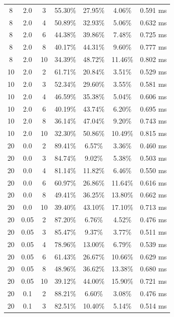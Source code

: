 \documentclass[11pt,a4paper]{article}
\begin{document}
\begin{longtable}{ccccccc}
        8 & 2.0 & 3 & 55.30\% & 27.95\% & 4.06\% & 0.591 ms \\
        8 & 2.0 & 4 & 50.89\% & 32.93\% & 5.06\% & 0.632 ms \\
        8 & 2.0 & 6 & 44.38\% & 39.86\% & 7.48\% & 0.725 ms \\
        8 & 2.0 & 8 & 40.17\% & 44.31\% & 9.60\% & 0.777 ms \\
        8 & 2.0 & 10 & 34.39\% & 48.72\% & 11.46\% & 0.802 ms \\
        \midrule
        10 & 2.0 & 2 & 61.71\% & 20.84\% & 3.51\% & 0.529 ms \\
        10 & 2.0 & 3 & 52.34\% & 29.60\% & 3.55\% & 0.581 ms \\
        10 & 2.0 & 4 & 46.59\% & 35.38\% & 5.04\% & 0.606 ms \\
        10 & 2.0 & 6 & 40.19\% & 43.74\% & 6.20\% & 0.695 ms \\
        10 & 2.0 & 8 & 36.14\% & 47.04\% & 9.20\% & 0.743 ms \\
        10 & 2.0 & 10 & 32.30\% & 50.86\% & 10.49\% & 0.815 ms \\
        \midrule
        20 & 0.0 & 2 & 89.41\% & 6.57\% & 3.36\% & 0.460 ms \\
        20 & 0.0 & 3 & 84.74\% & 9.02\% & 5.38\% & 0.503 ms \\
        20 & 0.0 & 4 & 81.14\% & 11.82\% & 6.46\% & 0.550 ms \\
        20 & 0.0 & 6 & 60.97\% & 26.86\% & 11.64\% & 0.616 ms \\
        20 & 0.0 & 8 & 49.41\% & 36.25\% & 13.80\% & 0.662 ms \\
        20 & 0.0 & 10 & 39.40\% & 43.10\% & 17.10\% & 0.713 ms \\
        \midrule
        20 & 0.05 & 2 & 87.20\% & 6.76\% & 4.52\% & 0.476 ms \\
        20 & 0.05 & 3 & 85.47\% & 9.37\% & 3.77\% & 0.511 ms \\
        20 & 0.05 & 4 & 78.96\% & 13.00\% & 6.79\% & 0.539 ms \\
        20 & 0.05 & 6 & 61.43\% & 26.67\% & 10.66\% & 0.629 ms \\
        20 & 0.05 & 8 & 48.96\% & 36.62\% & 13.38\% & 0.680 ms \\
        20 & 0.05 & 10 & 39.12\% & 44.00\% & 15.90\% & 0.721 ms \\
        \midrule
        20 & 0.1 & 2 & 88.21\% & 6.60\% & 3.08\% & 0.476 ms \\
        20 & 0.1 & 3 & 82.51\% & 10.40\% & 5.14\% & 0.514 ms \\

\end{longtable}
\end{document}
